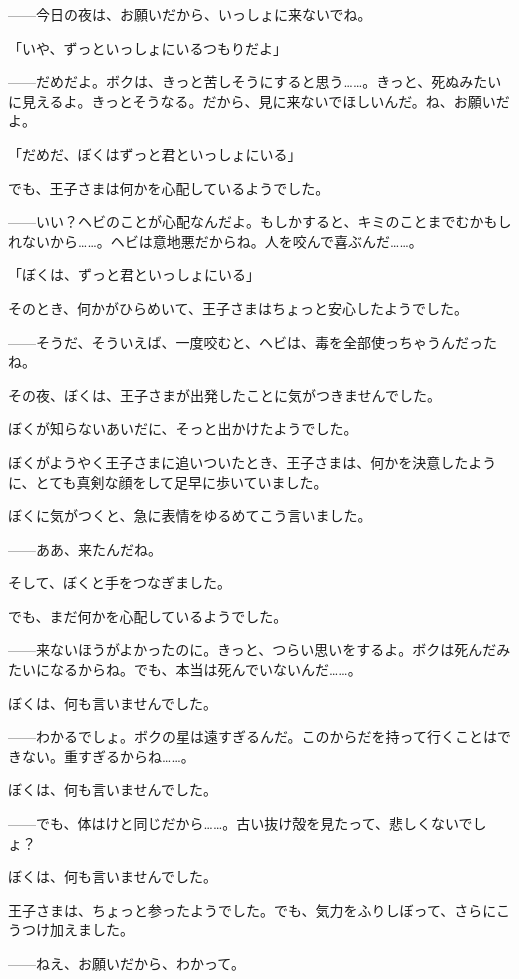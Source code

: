 ——今日の夜は、お願いだから、いっしょに来ないでね。

「いや、ずっといっしょにいるつもりだよ」

——だめだよ。ボクは、きっと苦しそうにすると思う……。きっと、死ぬみたいに見えるよ。きっとそうなる。だから、見に来ないでほしいんだ。ね、お願いだよ。

「だめだ、ぼくはずっと君といっしょにいる」

でも、王子さまは何かを心配しているようでした。

——いい？ヘビのことが心配なんだよ。もしかすると、キミのことまでむかもしれないから……。ヘビは意地悪だからね。人を咬んで喜ぶんだ……。

「ぼくは、ずっと君といっしょにいる」

そのとき、何かがひらめいて、王子さまはちょっと安心したようでした。

——そうだ、そういえば、一度咬むと、ヘビは、毒を全部使っちゃうんだったね。

その夜、ぼくは、王子さまが出発したことに気がつきませんでした。

ぼくが知らないあいだに、そっと出かけたようでした。

ぼくがようやく王子さまに追いついたとき、王子さまは、何かを決意したように、とても真剣な顔をして足早に歩いていました。

ぼくに気がつくと、急に表情をゆるめてこう言いました。


——ああ、来たんだね。

そして、ぼくと手をつなぎました。

でも、まだ何かを心配しているようでした。

——来ないほうがよかったのに。きっと、つらい思いをするよ。ボクは死んだみたいになるからね。でも、本当は死んでいないんだ……。

ぼくは、何も言いませんでした。

——わかるでしょ。ボクの星は遠すぎるんだ。このからだを持って行くことはできない。重すぎるからね……。

ぼくは、何も言いませんでした。

——でも、体はけと同じだから……。古い抜け殻を見たって、悲しくないでしょ？

ぼくは、何も言いませんでした。

王子さまは、ちょっと参ったようでした。でも、気力をふりしぼって、さらにこうつけ加えました。

——ねえ、お願いだから、わかって。

